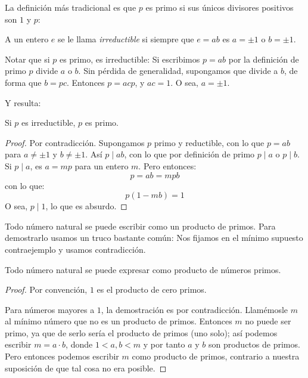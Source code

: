   La definición más tradicional es que \(p\) es primo
  si sus únicos divisores positivos son \(1\) y \(p\):
  \begin{definition}
    \label{def:Z:irreducible}
    A un entero \(e\) se le llama \emph{irreductible}
    si siempre que \(e = a b\) es \(a = \pm 1\) o \(b = \pm 1\).
  \end{definition}
  Notar que si \(p\) es primo,
  es irreductible:
  Si escribimos \(p = a b\) por la definición de primo
  \(p\) divide \(a\) o \(b\).
  Sin pérdida de generalidad,
  supongamos que divide a \(b\),
  de forma que \(b = p c\).
  Entonces \(p = a c p\),
  y \(a c = 1\).
  O sea,
  \(a = \pm 1\).

  Y resulta:
  \begin{theorem}
    \label{theo:Z:irreductible=>prime}
    Si \(p\) es irreductible,
    \(p\) es primo.
  \end{theorem}
  \begin{proof}
    Por contradicción.%
    Supongamos \(p\) primo y reductible,
    con lo que \(p = a b\)
    para \(a \ne \pm 1\) y \(b \ne \pm 1\).
    Así \(p \mid a b\),
    con lo que por definición de primo \(p \mid a\) o \(p \mid b\).
    Si \(p \mid a\),
    es \(a = m p\) para un entero \(m\).
    Pero entonces:
    \begin{equation*}
      p = a b = m p b
    \end{equation*}
    con lo que:
    \begin{equation*}
      p (1 - m b) = 1
    \end{equation*}
    O sea,
    \(p \mid 1\),
    lo que es absurdo.
  \end{proof}

  Todo número natural se puede escribir como un producto de primos.
  Para demostrarlo usamos un truco bastante común:
  Nos fijamos en el mínimo supuesto contraejemplo
  y usamos contradicción.
  \begin{theorem}
    \label{theo:natural=producto-primos}
    Todo número natural se puede expresar como producto de números primos.
  \end{theorem}
  \begin{proof}
    Por convención,
    \(1\) es el producto de cero primos.

    Para números mayores a \(1\),
    la demostración es por contradicción.
    Llamémosle \(m\) al mínimo número que no es un producto de primos.
    Entonces \(m\) no puede ser primo,
    ya que de serlo sería el producto de primos
    (uno solo);
    así podemos escribir \(m = a \cdot b\),
    donde \(1 < a, b < m\)
    y por tanto \(a\) y \(b\) son productos de primos.
    Pero entonces podemos escribir \(m\) como producto de primos,
    contrario a nuestra suposición de que tal cosa no era posible.
  \end{proof}

